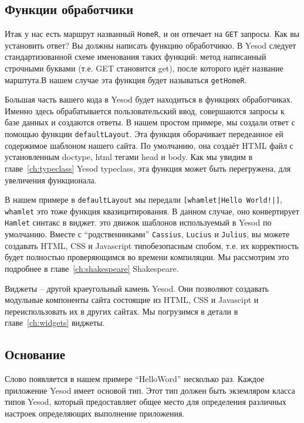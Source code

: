 \subsection{Функции обработчики}

Итак у нас есть маршрут названный \texttt{HomeR}, и он отвечает на \texttt{GET} запросы. 
Как вы установить ответ? Вы должны написать функцию обработчикю. В Yesod следует
стандартизованной схеме именования таких функций: 
метод написанный строчными буквами (т.е. GET становится get), после которого идёт 
название марштута.В нашем случае эта функция будет называться \lstinline'getHomeR'.

Большая часть вашего кода в Yesod будет находиться в функциях обработчиках. 
Именно здесь обрабатывается пользовательский ввод, совершаются запросы к базе данных и создаются ответы. 
В нашем простом примере, мы создали ответ с помощью функции \lstinline'defaultLayout'. 
Эта функция оборачивает передеанное ей содержимое шаблоном нашего сайта. 
По умолчанию, она создаёт HTML файл с установленным doctype, html тегами head и body. 
Как мы увидим в главе~\ref{ch:typeclass} Yesod typeclass, эта функция может быть перегружена,
для увеличения функционала.

В нашем примере в \lstinline'defaultLayout' мы передали \lstinline'[whamlet|Hello World!|]', 
\lstinline'whamlet' это тоже функция квазицитирования. В данном случае, оно конвертирует 
\texttt{Hamlet} синтакс в виджет.  это движок  шаблонов используемый
в Yesod по умолчанию. Вместе с ``родственниками'' \texttt{Cassius}, \texttt{Lucius} и \texttt{Julius}, 
вы можете создавать HTML, CSS и Javascript типобезопасным спобом, т.е. 
их корректность будет полностью проверяющимся во времени компиляции. Мы рассмотрим это подробнее в 
главе~\ref{ch:shakespeare} Shakespeare.

Виджеты -- другой краеугольный камень Yesod. Они позволяют создавать модульные компоненты сайта 
состоящие из HTML, CSS и Javascipt и переиспользовать их в других сайтах. Мы погрузимся в детали
в главе~\ref{ch:widgets} виджеты.

\subsection{Основание}

Слово появляется в нашем примере ``HelloWord'' несколько раз. Каждое приложение 
Yesod имеет основой тип. Этот тип должен быть экземляром класса типов Yesod, 
который предоставляет общее место для определения различных настроек определяющих 
выполнение приложения.

